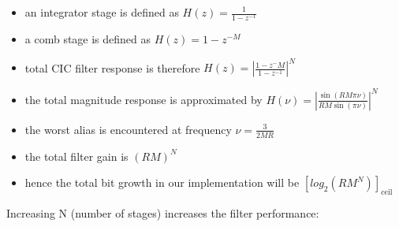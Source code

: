 \documentclass{article}
\begin{document}
\begin{itemize}
	\item an integrator stage is defined as $H(z) = \frac{1}{1 - z^{-1}}$\\
	
	\item a comb stage is defined as $H(z) = 1 - z^{-M}$\\
	
	\item total CIC filter response is therefore $H(z) = \left| \frac{1 - z^-M}{1 - z^{-1}} \right|^N$
	
	\item the total magnitude response is approximated by
	$H(\nu) = \left| \frac{\sin(R M \pi \nu)}{R M \sin(\pi \nu)} \right|^N$

	\item the worst alias is encountered at frequency $\nu = \frac{3}{2MR}$

	\item the total filter gain is $(RM)^N$
	\item hence the total bit growth in our implementation
	will be $\left[ log_2\left(RM^N\right) \right]_\text{ceil}$
\end{itemize}

\newpage
Increasing N (number of stages) increases the filter performance:
\end{document}
